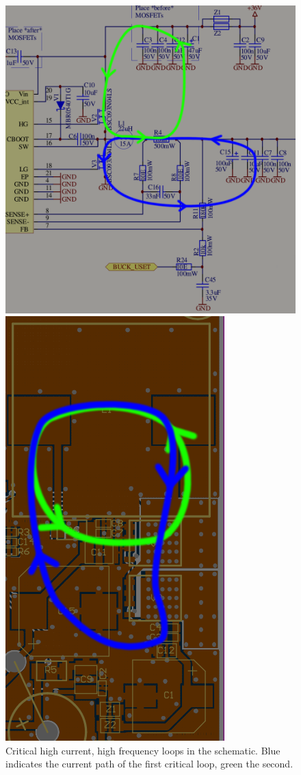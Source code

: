 \begin{figure}[th!]
    \centering
    \begin{minipage}{.4\textwidth}
        \centering
        \includegraphics[width=\textwidth]{images/circuit/schematic_high_current.png}
        \caption{Critical high current, high frequency loops in the schematic. Blue indicates the current path of the first critical loop, green the second.}
        \label{fig:pcb:loops1}
    \end{minipage}
    \begin{minipage}{.5\textwidth}
        \centering
        \includegraphics[width=.6\textwidth]{images/pcb/buck2.png}

\end{minipage}
\end{figure}

